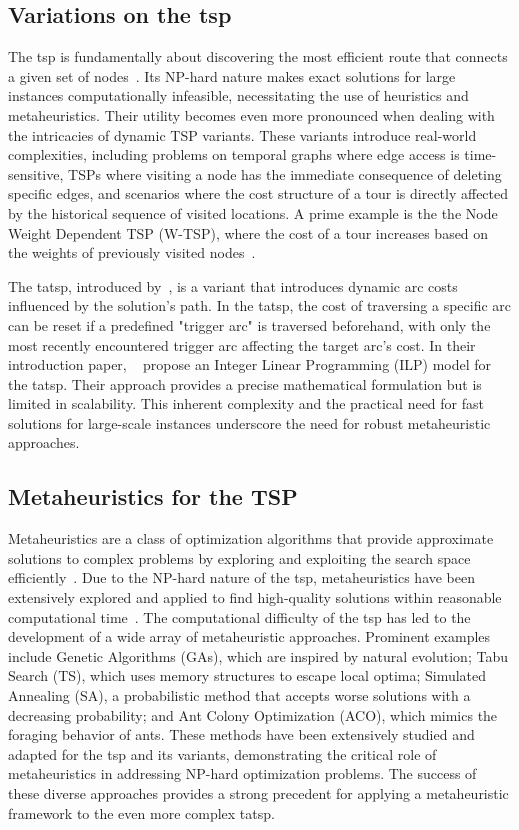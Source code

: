 \documentclass[twocolumn, switch]{article} %
\begin{document}
\subsection{Variations on the \gls{tsp}}

The \gls{tsp} is fundamentally about discovering the most efficient route that connects a given set of nodes~\cite{Reinelt2003}. 
Its NP-hard nature makes exact solutions for large instances computationally infeasible, necessitating the use of heuristics and metaheuristics.
Their utility becomes even more pronounced when dealing with the intricacies of dynamic TSP variants. These variants introduce 
real-world complexities, including problems on temporal graphs where edge access is time-sensitive, TSPs where visiting a node 
has the immediate consequence of deleting specific edges, and scenarios where the cost structure of a tour is directly affected 
by the historical sequence of visited locations. A prime example is the the Node Weight Dependent TSP (W-TSP), where the cost of a 
tour increases based on the weights of previously visited nodes~\cite{Bossek2020}.

The \gls{tatsp}, introduced by~\citet{Cerrone}, is a variant that introduces dynamic arc costs influenced by the solution's path. 
In the \gls{tatsp}, the cost of traversing a specific arc can be reset if a predefined "trigger arc" is traversed beforehand, 
with only the most recently encountered trigger arc affecting the target arc's cost. In their introduction paper, ~\citet{Cerrone} 
propose an Integer Linear Programming (ILP) model for the \gls{tatsp}. Their approach provides a precise mathematical formulation 
but is limited in scalability. This inherent complexity and the practical need for fast solutions for large-scale instances underscore
 the need for robust metaheuristic approaches.

\subsection{Metaheuristics for the TSP}
\label{sec:metaheuristics_tsp}

Metaheuristics are a class of optimization algorithms that provide approximate solutions to complex problems by exploring and exploiting the search space efficiently~\cite{Gendreau2010}. Due to the NP-hard nature of the \gls{tsp}, metaheuristics have been extensively explored and applied to find high-quality solutions within reasonable computational time~\cite{toaza2023}. 
The computational difficulty of the \gls{tsp} has led to the development of a wide array of metaheuristic approaches. Prominent examples include Genetic Algorithms (GAs), which are inspired by natural evolution; Tabu Search (TS), which uses memory structures to escape local optima; Simulated Annealing (SA), a probabilistic method that accepts worse solutions with a decreasing probability; and Ant Colony Optimization (ACO), which mimics the foraging behavior of ants. These methods have been extensively studied and adapted for the \gls{tsp} and its variants, demonstrating the critical role of metaheuristics in addressing NP-hard optimization problems. The success of these diverse approaches provides a strong precedent for applying a metaheuristic framework to the even more complex \gls{tatsp}.
\end{document}
